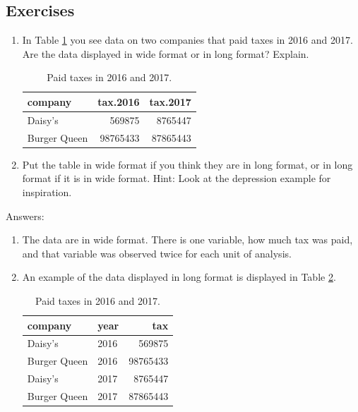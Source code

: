 \documentclass[]{report}\usepackage[]{graphicx}\usepackage[]{color}
\begin{document}
\subsection{Exercises}


\begin{enumerate}

\item In Table \ref{tab:taxes} you see data on two companies that paid taxes in 2016 and 2017. Are the data displayed in wide format or in long format? Explain.

\begin{table}[ht]
\centering
\caption{Paid taxes in 2016 and 2017.} 
\label{tab:taxes}
\begin{tabular}{lrr}
  \hline
company & tax.2016 & tax.2017 \\ 
  \hline
Daisy's & 569875 & 8765447 \\ 
  Burger Queen & 98765433 & 87865443 \\ 
   \hline
\end{tabular}
\end{table}


\item Put the table in wide format if you think they are in long format, or in long format if it is in wide format. Hint: Look at the depression example for inspiration.

\end{enumerate}

Answers:

\begin{enumerate}

\item The data are in wide format. There is one variable, how much tax was paid, and that variable was observed twice for each unit of analysis.



\item An example of the data displayed in long format is displayed in Table \ref{tab:taxeslong}.

\begin{table}[ht]
\centering
\caption{Paid taxes in 2016 and 2017.} 
\label{tab:taxeslong}
\begin{tabular}{llr}
  \hline
company & year & tax \\ 
  \hline
Daisy's & 2016 & 569875 \\ 
  Burger Queen & 2016 & 98765433 \\ 
  Daisy's & 2017 & 8765447 \\ 
  Burger Queen & 2017 & 87865443 \\ 
   \hline
\end{tabular}
\end{table}


\end{enumerate}
\end{document}
